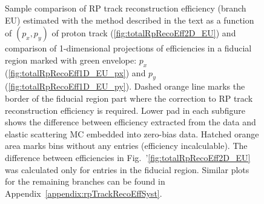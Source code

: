 \begin{figure}[h]\vspace{-10pt}
	\centering
	\parbox{0.54\textwidth}{
		\centering
		\begin{subfigure}[b]{\linewidth}{\vspace{10pt}
				}
		\end{subfigure}
  \begin{minipage}[t][0.64\linewidth][t]{\linewidth}\vspace{5pt}
	\caption[Coparison of estimated RP track reconstruction efficiency in 2D and 1D (branch EU).]%
	{Sample comparison of RP track reconstruction efficiency (branch EU) estimated with the method described in the text as a function of $(p_{x},p_{y})$ of proton track (\ref{fig:totalRpRecoEff2D_EU}) and comparison of 1-dimensional projections of efficiencies in a fiducial region marked with green envelope: $p_{x}$ (\ref{fig:totalRpRecoEff1D_EU_px}) and $p_{y}$ (\ref{fig:totalRpRecoEff1D_EU_py}). Dashed orange line marks the border of the fiducial region part where the correction to RP track reconstruction efficiency is required. Lower pad in each subfigure shows the difference between efficiency extracted from the data and elastic scattering MC embedded into zero-bias data. Hatched orange area marks bins without any entries (efficiency incalculable). The difference between efficiencies in Fig.~'\ref{fig:totalRpRecoEff2D_EU} was calculated only for entries in the fiducial region. Similar plots for the remaining branches can be found in Appendix~\ref{appendix:rpTrackRecoEffSyst}.%
}
\end{minipage}}
\end{figure}
